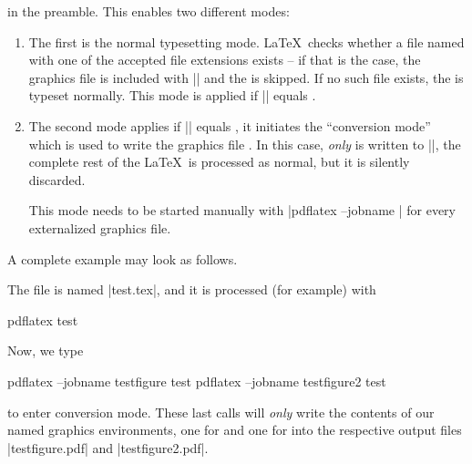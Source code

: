 \noindent in the preamble. This enables two different modes: 
\begin{enumerate}
	\item The first is the normal typesetting mode. \LaTeX\ checks whether a file named  with one of the accepted file extensions exists -- if that is the case, the graphics file is included with |\pgfimage| and the  is skipped. If no such file exists, the  is typeset normally. This mode is applied if |\jobname| equals .
	\item The second mode applies if |\jobname| equals , it initiates the ``conversion mode'' which is used to write the graphics file . In this case, \emph{only}  is written to |\jobname|, the complete rest of the \LaTeX\ is processed as normal, but it is silently discarded.

	This mode needs to be started manually with |pdflatex --jobname | for every externalized graphics file.
\end{enumerate}
A complete example may look as follows.
\noindent The file is named |test.tex|, and it is processed (for example) with
\begin{codeexample}
pdflatex test	
\end{codeexample}
\noindent Now, we type
\begin{codeexample}
pdflatex --jobname testfigure test	
pdflatex --jobname testfigure2 test	
\end{codeexample}
\noindent to enter conversion mode. These last calls will \emph{only} write the contents of our named graphics environments, one for  and one for  into the respective output files |testfigure.pdf| and |testfigure2.pdf|.

